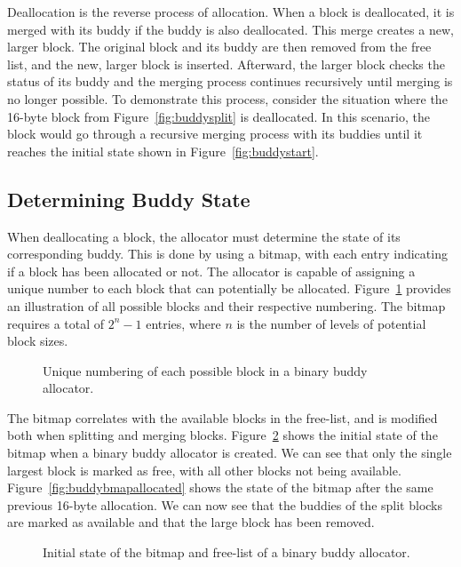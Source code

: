 Deallocation is the reverse process of allocation. When a block is deallocated, it is merged with its buddy if the buddy is also deallocated. This merge creates a new, larger block. The original block and its buddy are then removed from the free list, and the new, larger block is inserted. Afterward, the larger block checks the status of its buddy and the merging process continues recursively until merging is no longer possible. To demonstrate this process, consider the situation where the 16-byte block from Figure~\ref{fig:buddysplit} is deallocated. In this scenario, the block would go through a recursive merging process with its buddies until it reaches the initial state shown in Figure~\ref{fig:buddystart}.

\subsection{Determining Buddy State}
When deallocating a block, the allocator must determine the state of its corresponding buddy. This is done by using a bitmap, with each entry indicating if a block has been allocated or not. The allocator is capable of assigning a unique number to each block that can potentially be allocated. Figure~\ref{fig:buddyorder} provides an illustration of all possible blocks and their respective numbering. The bitmap requires a total of $2^n - 1$ entries, where $n$ is the number of levels of potential block sizes.

\begin{figure}[H]
    \centering
    
    \caption{Unique numbering of each possible block in a binary buddy allocator.}
    \label{fig:buddyorder}
\end{figure}

The bitmap correlates with the available blocks in the free-list, and is modified both when splitting and merging blocks. Figure~\ref{fig:buddybmap} shows the initial state of the bitmap when a binary buddy allocator is created. We can see that only the single largest block is marked as free, with all other blocks not being available. Figure~\ref{fig:buddybmapallocated} shows the state of the bitmap after the same previous 16-byte allocation. We can now see that the buddies of the split blocks are marked as available and that the large block has been removed.

\begin{figure}[H]
    \centering
    
    \caption{Initial state of the bitmap and free-list of a binary buddy allocator.}
    \label{fig:buddybmap}
\end{figure}

